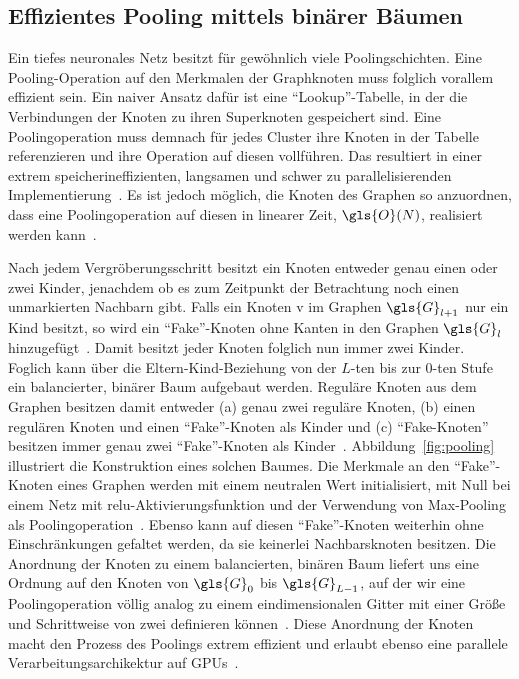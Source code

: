 \subsection{Effizientes Pooling mittels binärer Bäumen}
\label{pooling_mit_baeumen}

Ein tiefes neuronales Netz besitzt für gewöhnlich viele Poolingschichten.
Eine Poo\-ling-Operation auf den Merkmalen der Graphknoten muss folglich vorallem effizient sein.
Ein naiver Ansatz dafür ist eine \enquote{Lookup}-Tabelle, in der die Verbindungen der Knoten zu ihren Superknoten gespeichert sind.
Eine Poolingoperation muss demnach für jedes Cluster ihre Knoten in der Tabelle referenzieren und ihre Operation auf diesen vollführen.
Das resultiert in einer extrem speicherineffizienten, langsamen und schwer zu parallelisierenden Implementierung~\cite{Defferrard}.
Es ist jedoch möglich, die Knoten des Graphen so anzuordnen, dass eine Poolingoperation auf diesen in linearer Zeit, \dhe{} $\gls{O}\left(N\right)$, realisiert werden kann~\cite{Defferrard}.



Nach jedem Vergröberungsschritt besitzt ein Knoten entweder genau einen oder zwei Kinder, jenachdem ob es zum Zeitpunkt der Betrachtung noch einen unmarkierten Nachbarn gibt.
Falls ein Knoten \gls{v} im Graphen $\gls{G}_{l+1}$ nur ein Kind besitzt, so wird ein \enquote{Fake}-Knoten ohne Kanten in den Graphen $\gls{G}_l$ hinzugefügt~\cite{Defferrard}.
Damit besitzt jeder Knoten folglich nun immer zwei Kinder.
Foglich kann über die Eltern-Kind-Beziehung von der $L$-ten bis zur $0$-ten Stufe ein balancierter, binärer Baum aufgebaut werden.
Reguläre Knoten aus dem Graphen besitzen damit entweder (a) genau zwei reguläre Knoten, (b) einen regulären Knoten und einen \enquote{Fake}-Knoten als Kinder und (c) \enquote{Fake-Knoten} besitzen immer genau zwei \enquote{Fake}-Knoten als Kinder~\cite{Defferrard}.
Abbildung~\ref{fig:pooling} illustriert die Konstruktion eines solchen Baumes.
Die Merkmale an den \enquote{Fake}-Knoten eines Graphen werden mit einem neutralen Wert initialisiert, \dhe{} \zB{} mit Null bei einem Netz mit \gls{relu}-Aktivierungsfunktion und der Verwendung von Max-Pooling als Poolingoperation~\cite{Defferrard}.
Ebenso kann auf diesen \enquote{Fake}-Knoten weiterhin ohne Einschränkungen gefaltet werden, da sie keinerlei Nachbarsknoten besitzen.
Die Anordnung der Knoten zu einem balancierten, binären Baum liefert uns eine Ordnung auf den Knoten von $\gls{G}_0$ bis $\gls{G}_{L-1}$, auf der wir eine Poolingoperation völlig analog zu einem eindimensionalen Gitter mit einer Größe und Schrittweise von zwei definieren können~\cite{Defferrard}.
Diese Anordnung der Knoten macht den Prozess des Poolings extrem effizient und erlaubt ebenso eine parallele Verarbeitungsarchikektur auf GPUs~\cite{Defferrard}.

